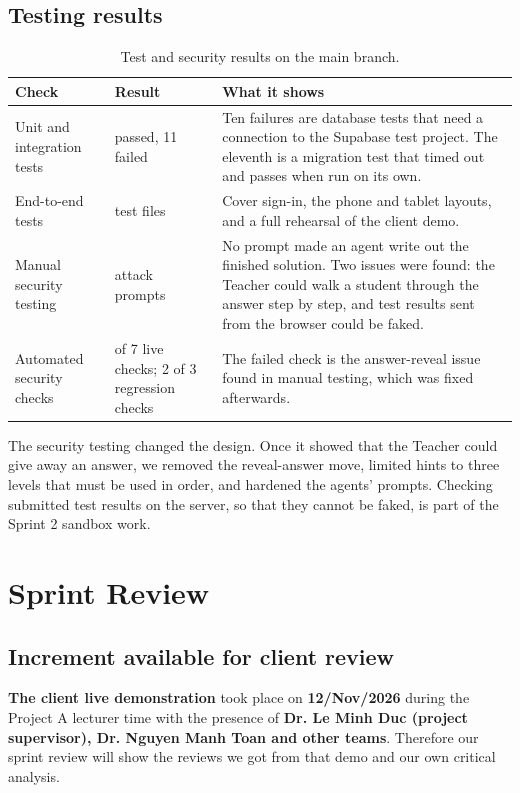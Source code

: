 \documentclass[11pt,a4paper]{article}
\begin{document}
\subsection{Testing results}
{\small
\begin{longtable}{>{\raggedright\arraybackslash}p{}>{\raggedright\arraybackslash}p{}>{\raggedright\arraybackslash}p{}}
\caption{Test and security results on the main branch.}\\
\toprule
\textbf{Check} & \textbf{Result} & \textbf{What it shows} \\
\midrule
\endhead
Unit and integration tests & 303 passed, 11 failed & Ten failures are database tests that need a connection to the Supabase test project. The eleventh is a migration test that timed out and passes when run on its own. \\
End-to-end tests & 6 test files & Cover sign-in, the phone and tablet layouts, and a full rehearsal of the client demo. \\
Manual security testing & 89 attack prompts & No prompt made an agent write out the finished solution. Two issues were found: the Teacher could walk a student through the answer step by step, and test results sent from the browser could be faked. \\
Automated security checks & 7 of 7 live checks; 2 of 3 regression checks & The failed check is the answer-reveal issue found in manual testing, which was fixed afterwards. \\
\bottomrule
\end{longtable}}
The security testing changed the design. Once it showed that the Teacher could give away an answer, we removed the reveal-answer move, limited hints to three levels that must be used in order, and hardened the agents' prompts. Checking submitted test results on the server, so that they cannot be faked, is part of the Sprint 2 sandbox work.

\section{Sprint Review}
\subsection{Increment available for client review}
\textbf{The client live demonstration} took place on \textbf{12/Nov/2026} during the Project A lecturer time with the presence of \textbf{Dr. Le Minh Duc (project supervisor), Dr. Nguyen Manh Toan and other teams}. Therefore our sprint review will show the reviews we got from that demo and our own critical analysis.
\end{document}
